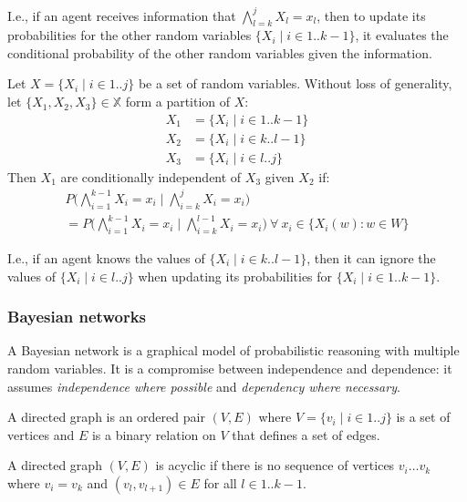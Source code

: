 I.e., if an agent receives information that $\bigwedge_{l = k}^{j} X_l = x_l$,
then to update its probabilities for the other random variables $\{ X_i \mid i
  \in 1 .. k - 1 \}$, it evaluates the conditional probability of the other
random variables given the information.

\begin{dfn}
  Let $X = \{ X_i \mid i \in 1 .. j \}$ be a set of random variables.
  Without loss of generality, let $\{ X_1, X_2, X_3 \} \in \mathbb{X}$ form a
  partition of $X$:
  \begin{align*}
    X_1 & = \{ X_i \mid i \in 1 .. k - 1 \}
    \\
    X_2 & = \{ X_i \mid i \in k .. l - 1 \}
    \\
    X_3 & = \{ X_i \mid i \in l .. j \}
  \end{align*}
  Then $X_1$ are conditionally independent of $X_3$ given $X_2$ if:
  \begin{multline}
    P \bigl( \bigwedge_{i = 1}^{k - 1} X_i = x_i \mid \bigwedge_{i = k}^{j} X_i =
    x_i \bigr)
    \\
    = P \bigl( \bigwedge_{i = 1}^{k - 1} X_i = x_i \mid \bigwedge_{i
      = k}^{l - 1} X_i = x_i \bigr) \ \forall\ x_i \in \{ X_i(w) : w \in W \}
  \end{multline}
\end{dfn}

I.e., if an agent knows the values
of $\{ X_i \mid i \in k .. l - 1 \}$, then it can ignore the values of $\{ X_i
  \mid i \in l .. j \}$ when updating its probabilities for $\{ X_i \mid i \in 1
  .. k - 1 \}$.

\subsubsection{Bayesian networks}

A Bayesian network is a graphical model of probabilistic reasoning with
multiple random variables.
It is a compromise between independence and dependence: it assumes
\textit{independence where possible} and \textit{dependency where necessary}.

\begin{dfn}
  A directed graph is an ordered pair $(V, E)$ where
  $V = \{ v_i \mid i \in 1 .. j \}$ is a set of vertices and $E$ is a binary
  relation on $V$ that defines a set of edges.
\end{dfn}

\begin{dfn}
  A directed graph $(V, E)$ is acyclic if there is no sequence of vertices
  $v_i \ldots v_k$ where $v_i = v_k$ and $(v_l, v_{l + 1}) \in E$ for all
  $l \in 1 .. k - 1$.
\end{dfn}


